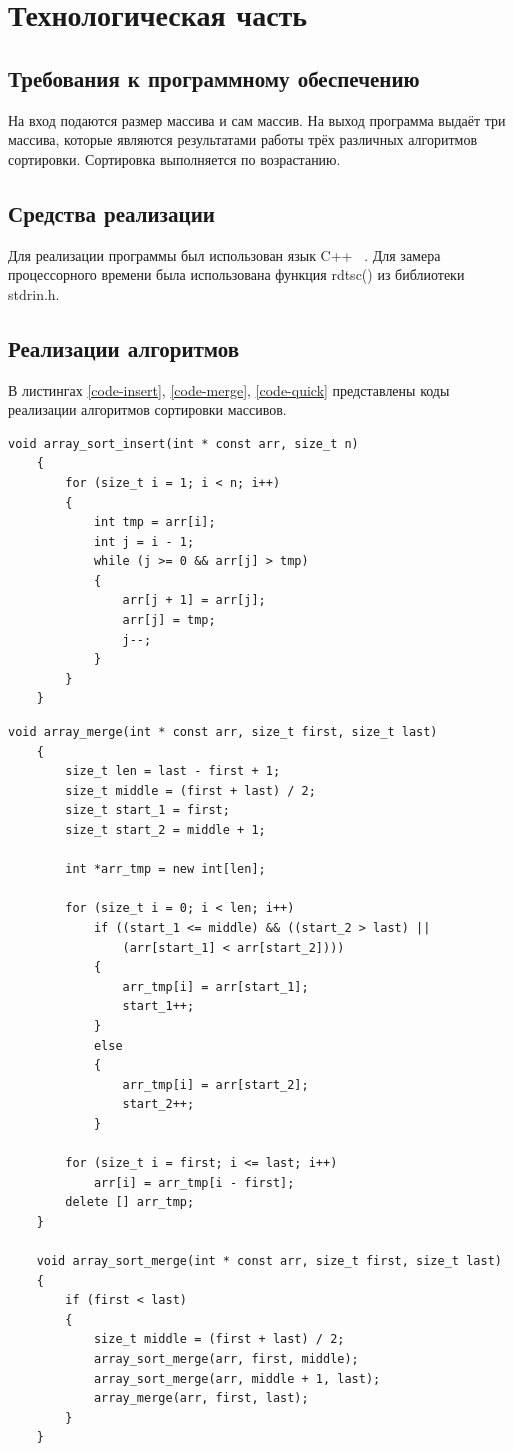 \documentclass[12pt, a4paper]{report}
\begin{document}
	
	\chapter{Технологическая часть}
	\section{Требования к программному обеспечению}
	На вход подаются размер массива и сам массив. На выход программа выдаёт три массива, которые являются результатами работы трёх различных алгоритмов сортировки. Сортировка выполняется по возрастанию.
	\section{Средства реализации}
	Для реализации программы был использован язык C++ ~\cite{CPP}. Для замера процессорного времени была использована функция rdtsc() из библиотеки stdrin.h.
	\section{Реализации алгоритмов}
	В листингах \ref{code-insert}, \ref{code-merge}, \ref{code-quick} представлены коды реализации алгоритмов сортировки массивов.
	\begin{lstlisting}[label=code-insert,caption=Сортировка вставками]
	void array_sort_insert(int * const arr, size_t n)
	{
		for (size_t i = 1; i < n; i++)
		{
			int tmp = arr[i];
			int j = i - 1;
			while (j >= 0 && arr[j] > tmp)
			{
				arr[j + 1] = arr[j];
				arr[j] = tmp;
				j--;
			}
		}
	}
	\end{lstlisting}

	\begin{lstlisting}[label=code-merge,caption=Сортировка слиянием]
	void array_merge(int * const arr, size_t first, size_t last)
	{
		size_t len = last - first + 1;
		size_t middle = (first + last) / 2;
		size_t start_1 = first;
		size_t start_2 = middle + 1;
		
		int *arr_tmp = new int[len];
		
		for (size_t i = 0; i < len; i++)
			if ((start_1 <= middle) && ((start_2 > last) ||
				(arr[start_1] < arr[start_2])))
			{
				arr_tmp[i] = arr[start_1];
				start_1++;
			}
			else
			{
				arr_tmp[i] = arr[start_2];
				start_2++;
			}
		
		for (size_t i = first; i <= last; i++)
			arr[i] = arr_tmp[i - first];
		delete [] arr_tmp;
	}
	
	void array_sort_merge(int * const arr, size_t first, size_t last)
	{
		if (first < last)
		{
			size_t middle = (first + last) / 2;
			array_sort_merge(arr, first, middle);
			array_sort_merge(arr, middle + 1, last);
			array_merge(arr, first, last);
		}
	}
	\end{lstlisting}
\end{document}
